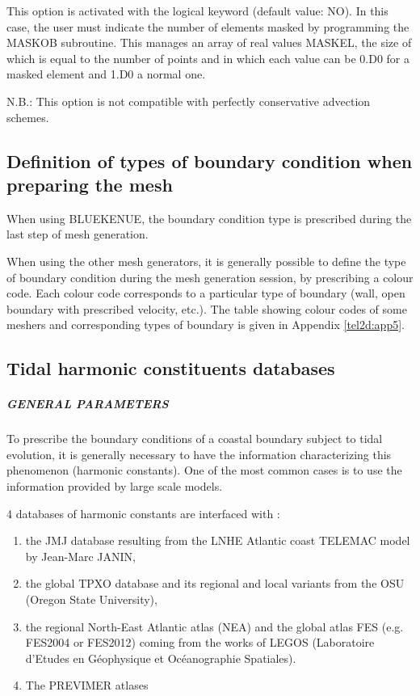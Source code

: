  This option is activated with the logical keyword  (default value: NO). In this case, the user must indicate the number of elements masked by programming the MASKOB subroutine. This manages an array of real values MASKEL, the size of which is equal to the number of points and in which each value can be 0.D0 for a masked element and 1.D0 a normal one.

 N.B.: This option is not compatible with perfectly conservative advection schemes.


\subsection{ Definition of types of boundary condition when preparing the mesh}

 When using BLUEKENUE, the boundary condition type is prescribed during the last step of mesh generation.

 When using the other mesh generators, it is generally possible to define the type of boundary condition during the mesh generation session, by prescribing a colour code. Each colour code corresponds to a particular type of boundary (wall, open boundary with prescribed velocity, etc.). The table showing colour codes of some meshers and corresponding types of boundary is given in Appendix \ref{tel2d:app5}.


\subsection{ Tidal harmonic constituents databases}
\label{subs:tidal:harm:datab}

\subparagraph{ GENERAL PARAMETERS}

 To prescribe the boundary conditions of a coastal boundary subject to tidal evolution, it is generally necessary to have the information characterizing this phenomenon (harmonic constants). One of the most common cases is to use the information provided by large scale models.

 4 databases of harmonic constants are interfaced with :

\begin{enumerate}
\item  the JMJ database resulting from the LNHE Atlantic coast TELEMAC model by Jean-Marc JANIN,

\item  the global TPXO database and its regional and local variants from the OSU (Oregon State University),

\item  the regional North-East Atlantic atlas (NEA) and the global atlas FES (e.g. FES2004 or FES2012) coming from the works of LEGOS (Laboratoire d'Etudes en G\'{e}ophysique et Oc\'{e}anographie Spatiales).

\item  The PREVIMER atlases
\end{enumerate}

